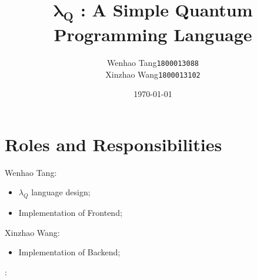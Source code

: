 \documentclass[11pt]{article}
\title{$\bm{\lambda_Q}$ : A Simple Quantum Programming Language}
\author{
  Wenhao Tang\quad \texttt{1800013088}
  \\[1ex]
  Xinzhao Wang\quad \texttt{1800013102}
}
\affil{Department of EECS\\ Peking University}
\date{\today}
\newcommand{\mycomment}[2]{{\small\color{magenta}\underline{\sf{#1}}:} {\color{magenta}{\small #2}}}
\begin{document}
\maketitle
\tableofcontents














\section{Roles and Responsibilities}
Wenhao Tang:
\begin{itemize}
  \item $\lambda_Q$ language design;
  \item Implementation of Frontend;
\end{itemize}

\noindent Xinzhao Wang:
\begin{itemize}
  \item Implementation of Backend;
\end{itemize}
\mycomment{twh}{Supplement here @wxz.}

\medskip


\end{document}
